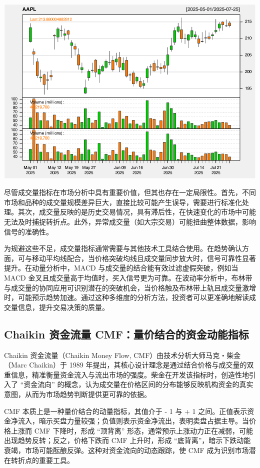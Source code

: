 \documentclass[]{ctexbook}
\begin{document}
\includegraphics[width=0.9\linewidth]{QuantmodHandbook_files/figure-latex/vo-2}

尽管成交量指标在市场分析中具有重要价值，但其也存在一定局限性。首先，不同市场和品种的成交量规模差异巨大，直接比较可能产生误导，需要进行标准化处理。其次，成交量反映的是历史交易情况，具有滞后性，在快速变化的市场中可能无法及时捕捉转折点。此外，异常成交量（如大宗交易）可能扭曲整体数据，影响信号的准确性。

为规避这些不足，成交量指标通常需要与其他技术工具结合使用。在趋势确认方面，可与移动平均线配合，当价格突破均线且成交量同步放大时，信号可靠性显著提升。在动量分析中，MACD 与成交量的结合能有效过滤虚假突破，例如当 MACD 金叉且成交量高于均值时，买入信号更为可靠。在波动率分析中，布林带与成交量的协同应用可识别潜在的突破机会，当价格触及布林带上轨且成交量激增时，可能预示趋势加速。通过这种多维度的分析方法，投资者可以更准确地解读成交量信息，提升交易决策的质量。

\subsection{Chaikin 资金流量 CMF：量价结合的资金动能指标}\label{chaikin-ux8d44ux91d1ux6d41ux91cf-cmfux91cfux4ef7ux7ed3ux5408ux7684ux8d44ux91d1ux52a8ux80fdux6307ux6807}

Chaikin 资金流量（Chaikin Money Flow, CMF）由技术分析大师马克・柴金（Marc Chaikin）于 1989 年提出，其核心设计理念是通过结合价格与成交量的双重信息，精准衡量资金流入与流出市场的强度。柴金在开发该指标时，创造性地引入了 ``资金流向'' 的概念，认为成交量在价格区间的分布能够反映机构资金的真实意图，从而为市场趋势判断提供更可靠的依据。

CMF 本质上是一种量价结合的动量指标，其值介于 - 1 与 + 1 之间。正值表示资金净流入，暗示买盘力量较强；负值则表示资金净流出，表明卖盘占据主导。当价格上涨而 CMF 下降时，形成 ``顶背离'' 形态，通常预示上涨动力正在减弱，可能出现趋势反转；反之，价格下跌而 CMF 上升时，形成 ``底背离''，暗示下跌动能衰竭，市场可能酝酿反弹。这种对资金流向的动态跟踪，使 CMF 成为识别市场潜在转折点的重要工具。
\end{document}
